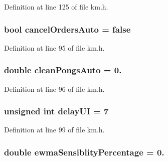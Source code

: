 Definition at line 125 of file km.\+h.

\subsubsection[{\texorpdfstring{cancel\+Orders\+Auto}{cancelOrdersAuto}}]{\setlength{\rightskip}{0pt plus 5cm}bool cancel\+Orders\+Auto = false}\hypertarget{struct_k_1_1m_quoting_params_a3a10c4191849a5c68d4c4837267d184c}{}\label{struct_k_1_1m_quoting_params_a3a10c4191849a5c68d4c4837267d184c}


Definition at line 95 of file km.\+h.

\subsubsection[{\texorpdfstring{clean\+Pongs\+Auto}{cleanPongsAuto}}]{\setlength{\rightskip}{0pt plus 5cm}double clean\+Pongs\+Auto = 0.}\hypertarget{struct_k_1_1m_quoting_params_a4b0a67a03f8ad8c612e57f550b026df3}{}\label{struct_k_1_1m_quoting_params_a4b0a67a03f8ad8c612e57f550b026df3}


Definition at line 96 of file km.\+h.

\subsubsection[{\texorpdfstring{delay\+UI}{delayUI}}]{\setlength{\rightskip}{0pt plus 5cm}unsigned int delay\+UI = 7}\hypertarget{struct_k_1_1m_quoting_params_a6c5f9f2975a817fbeb1c63a355108658}{}\label{struct_k_1_1m_quoting_params_a6c5f9f2975a817fbeb1c63a355108658}


Definition at line 99 of file km.\+h.

\subsubsection[{\texorpdfstring{ewma\+Sensiblity\+Percentage}{ewmaSensiblityPercentage}}]{\setlength{\rightskip}{0pt plus 5cm}double ewma\+Sensiblity\+Percentage = 0.}\hypertarget{struct_k_1_1m_quoting_params_aa9c1573602f4339de74409d7a69de26f}{}\label{struct_k_1_1m_quoting_params_aa9c1573602f4339de74409d7a69de26f}


